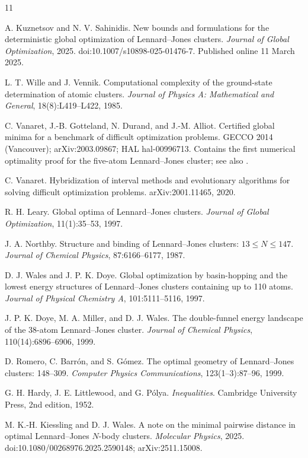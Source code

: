 \documentclass[11pt]{article}
\theoremstyle{remark}
\begin{document}
\begin{thebibliography}{11}

A. Kuznetsov and N. V. Sahinidis.
New bounds and formulations for the deterministic global optimization of Lennard--Jones clusters.
\emph{Journal of Global Optimization}, 2025.
doi:10.1007/s10898-025-01476-7. Published online 11 March 2025.

L. T. Wille and J. Vennik.
Computational complexity of the ground-state determination of atomic clusters.
\emph{Journal of Physics A: Mathematical and General}, 18(8):L419--L422, 1985.

C. Vanaret, J.-B. Gotteland, N. Durand, and J.-M. Alliot.
Certified global minima for a benchmark of difficult optimization problems.
GECCO 2014 (Vancouver); arXiv:2003.09867; HAL hal-00996713.
Contains the first numerical optimality proof for the five-atom Lennard--Jones cluster; see also \cite{vanaret2020}.

C. Vanaret.
Hybridization of interval methods and evolutionary algorithms for solving difficult optimization problems.
arXiv:2001.11465, 2020.

R. H. Leary.
Global optima of Lennard--Jones clusters.
\emph{Journal of Global Optimization}, 11(1):35--53, 1997.

J. A. Northby.
Structure and binding of Lennard--Jones clusters: $13\le N\le147$.
\emph{Journal of Chemical Physics}, 87:6166--6177, 1987.

D. J. Wales and J. P. K. Doye.
Global optimization by basin-hopping and the lowest energy structures of Lennard--Jones clusters containing up to 110 atoms.
\emph{Journal of Physical Chemistry A}, 101:5111--5116, 1997.

J. P. K. Doye, M. A. Miller, and D. J. Wales.
The double-funnel energy landscape of the 38-atom Lennard--Jones cluster.
\emph{Journal of Chemical Physics}, 110(14):6896--6906, 1999.

D. Romero, C. Barr\'on, and S. G\'omez.
The optimal geometry of Lennard--Jones clusters: 148--309.
\emph{Computer Physics Communications}, 123(1--3):87--96, 1999.

G. H. Hardy, J. E. Littlewood, and G. P\'olya.
\emph{Inequalities}.
Cambridge University Press, 2nd edition, 1952.

M. K.-H. Kiessling and D. J. Wales.
A note on the minimal pairwise distance in optimal Lennard--Jones $N$-body clusters.
\emph{Molecular Physics}, 2025.
doi:10.1080/00268976.2025.2590148; arXiv:2511.15008.

\end{thebibliography}
\end{document}
